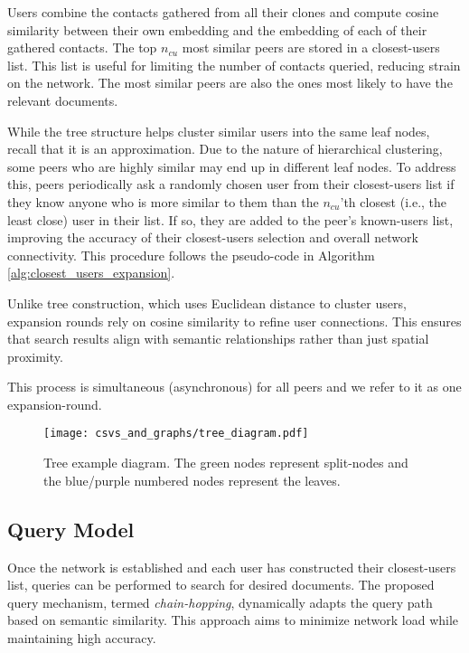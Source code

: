 \documentclass[10pt,journal]{IEEEtran}
\begin{document}
Users combine the contacts gathered from all their clones and compute cosine similarity between their own embedding and the embedding of each of their gathered contacts. The top $n_{cu}$ most similar peers are stored in a closest-users list. This list is useful for limiting the number of contacts queried, reducing strain on the network. The most similar peers are also the ones most likely to have the relevant documents.

While the tree structure helps cluster similar users into the same leaf nodes, recall that it is an approximation. Due to the nature of hierarchical clustering, some peers who are highly similar may end up in different leaf nodes. To address this, peers periodically ask a randomly chosen user from their closest-users list if they know anyone who is more similar to them than the $n_{cu}$'th closest (i.e., the least close) user in their list. If so, they are added to the peer’s known-users list, improving the accuracy of their closest-users selection and overall network connectivity. This procedure follows the pseudo-code in Algorithm \ref{alg:closest_users_expansion}.

Unlike tree construction, which uses Euclidean distance to cluster users, expansion rounds rely on cosine similarity to refine user connections. This ensures that search results align with semantic relationships rather than just spatial proximity.

This process is simultaneous (asynchronous) for all peers and we refer to it as one expansion-round.

\begin{figure}
    \texttt{[image: csvs\_and\_graphs/tree\_diagram.pdf]} 
    \caption{Tree example diagram. The green nodes represent split-nodes and the blue/purple numbered nodes represent the leaves.}
    \label{fig:tree_diagram}
\end{figure}
\subsection{Query Model}
Once the network is established and each user has constructed their closest-users list, queries can be performed to search for desired documents. The proposed query mechanism, termed \emph{chain-hopping}, dynamically adapts the query path based on semantic similarity. This approach aims to minimize network load while maintaining high accuracy.
\end{document}
